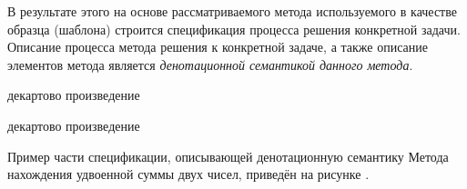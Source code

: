 В результате этого на основе рассматриваемого метода используемого в качестве образца (шаблона) строится спецификация процесса решения конкретной задачи. Описание процесса  метода решения к конкретной задаче, а также описание элементов метода является \textit{денотационной семантикой данного метода}.

\begin{SCn}
\begin{scnindent}
\end{scnindent}
\begin{scnindent}
    \begin{scnreltovector}{декартово произведение}
    \end{scnreltovector}
\end{scnindent}
\begin{scnindent}
    \begin{scnreltovector}{декартово произведение}
    \end{scnreltovector}
\end{scnindent}
\end{SCn}

Пример части спецификации, описывающей денотационную семантику Метода нахождения удвоенной суммы двух чисел, приведён на рисунке .

